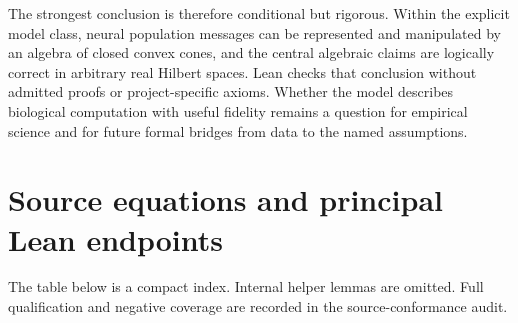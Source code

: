 \documentclass[11pt,a4paper]{article}
\begin{document}
The strongest conclusion is therefore conditional but rigorous. Within the
explicit model class, neural population messages can be represented and
manipulated by an algebra of closed convex cones, and the central algebraic
claims are logically correct in arbitrary real Hilbert spaces. Lean checks
that conclusion without admitted proofs or project-specific axioms. Whether
the model describes biological computation with useful fidelity remains a
question for empirical science and for future formal bridges from data to
the named assumptions.

\clearpage
\appendix

\section{Source equations and principal Lean endpoints}
\label{app:traceability}

The table below is a compact index. Internal helper lemmas are omitted. Full
qualification and negative coverage are recorded in the source-conformance
audit.
\end{document}
